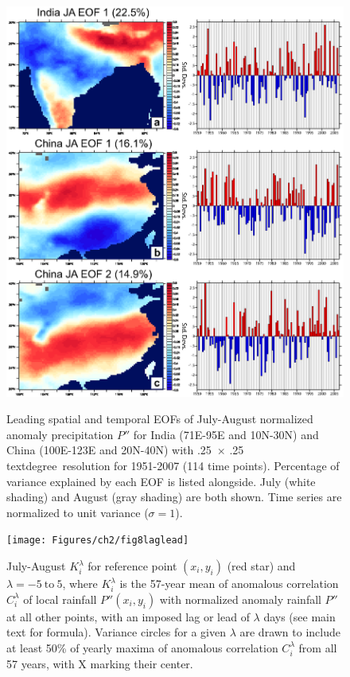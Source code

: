 \begin{figure}[t]
\centering
  \noindent\includegraphics[width=36pc,angle=0]{Figures/ch2/fig7eof_region}\\
  \caption{Leading spatial and temporal EOFs of July-August normalized anomaly precipitation $P''$ for India (71\textdegree E-95\textdegree E and 10\textdegree N-30\textdegree N) and China (100\textdegree E-123\textdegree E and 20\textdegree N-40\textdegree N) with .25\textdegree\ $\times$ .25
  textdegree\ resolution for 1951-2007 (114 time points). Percentage of variance explained by each EOF is listed alongside. July (white shading) and August (gray shading) are both shown. Time series are normalized to unit variance ($\sigma=1$).}\label{fig:f27}
\end{figure}

\begin{figure}[t]
  \centering
  \hspace*{-10mm}                                                           
  \noindent\texttt{[image: Figures/ch2/fig8laglead]}\\
  \caption{July-August $K_i^\lambda$ for reference point $(x_i,y_i)$ (red star) and $\lambda= -5\ \mathrm{ to }\ 5$, where $K_i^\lambda$ is the 57-year mean of anomalous correlation $C_i^\lambda$ of local rainfall $P''(x_i,y_i)$ with normalized anomaly rainfall $P''$ at all other points, with an imposed lag or lead of $\lambda$ days (see main text for formula). Variance circles for a given $\lambda$ are drawn to include at least 50\% of yearly maxima of anomalous correlation $C_i^\lambda$ from all 57 years, with X marking their center.}
  \label{fig:f28}
\end{figure}

